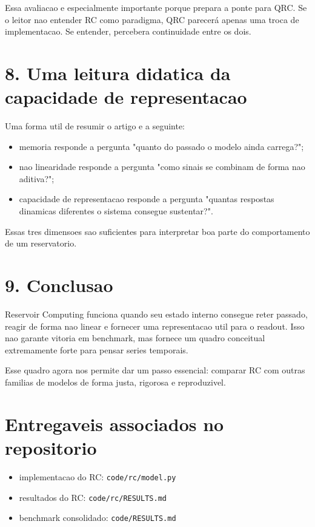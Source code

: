 \documentclass[12pt]{article}
\providecommand{\tightlist}{%
  \setlength{\itemsep}{0pt}\setlength{\parskip}{0pt}}
\begin{document}
Essa avaliacao e especialmente importante porque prepara a ponte para QRC. Se o leitor nao entender RC como paradigma, QRC parecerá apenas uma troca de implementacao. Se entender, percebera continuidade entre os dois.

\section{8. Uma leitura didatica da capacidade de representacao}\label{8-uma-leitura-didatica-da-capacidade-de-representacao}

Uma forma util de resumir o artigo e a seguinte:

\begin{itemize}
\tightlist
\item
  memoria responde a pergunta "quanto do passado o modelo ainda carrega?";
\item
  nao linearidade responde a pergunta "como sinais se combinam de forma nao aditiva?";
\item
  capacidade de representacao responde a pergunta "quantas respostas dinamicas diferentes o sistema consegue sustentar?".
\end{itemize}

Essas tres dimensoes sao suficientes para interpretar boa parte do comportamento de um reservatorio.

\section{9. Conclusao}\label{9-conclusao}

Reservoir Computing funciona quando seu estado interno consegue reter passado, reagir de forma nao linear e fornecer uma representacao util para o readout. Isso nao garante vitoria em benchmark, mas fornece um quadro conceitual extremamente forte para pensar series temporais.

Esse quadro agora nos permite dar um passo essencial: comparar RC com outras familias de modelos de forma justa, rigorosa e reproduzivel.

\section{Entregaveis associados no repositorio}\label{entregaveis-associados-no-repositorio}

\begin{itemize}
\tightlist
\item
  implementacao do RC: \texttt{code/rc/model.py}
\item
  resultados do RC: \texttt{code/rc/RESULTS.md}
\item
  benchmark consolidado: \texttt{code/RESULTS.md}
\end{itemize}
\end{document}
